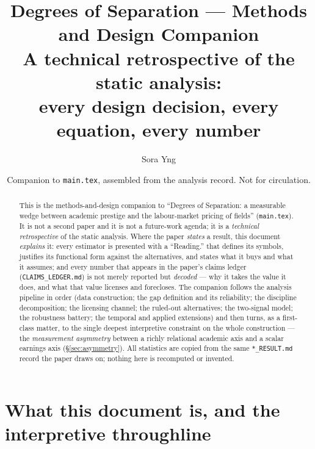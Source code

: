 \documentclass[11pt]{article}
\title{\textbf{Degrees of Separation --- Methods and Design Companion}\\[4pt]
\large A technical retrospective of the static analysis:\\
every design decision, every equation, every number}
\author{Sora Yng \and \coauthor{authorship/order to be set; see COAUTHOR\_NOTES.md}}
\date{Companion to \texttt{main.tex}, assembled from the analysis record. Not for circulation.}
\begin{document}
\maketitle

\begin{abstract}
This is the methods-and-design companion to ``Degrees of Separation: a measurable wedge between academic
prestige and the labour-market pricing of fields'' (\texttt{main.tex}). It is not a second paper and it is not
a future-work agenda; it is a \emph{technical retrospective} of the static analysis. Where the paper
\emph{states} a result, this document \emph{explains} it: every estimator is presented with a ``Reading.''
that defines its symbols, justifies its functional form against the alternatives, and states what it buys and
what it assumes; and every number that appears in the paper's claims ledger (\texttt{CLAIMS\_LEDGER.md}) is not
merely reported but \emph{decoded} --- why it takes the value it does, and what that value licenses and
forecloses. The companion follows the analysis pipeline in order (data construction; the gap definition and its
reliability; the discipline decomposition; the licensing channel; the ruled-out alternatives; the two-signal
model; the robustness battery; the temporal and applied extensions) and then turns, as a first-class matter, to
the single deepest interpretive constraint on the whole construction --- the \emph{measurement asymmetry}
between a richly relational academic axis and a scalar earnings axis (\S\ref{sec:asymmetry}). All statistics are
copied from the same \texttt{*\_RESULT.md} record the paper draws on; nothing here is recomputed or invented.
\end{abstract}

\section{What this document is, and the interpretive throughline}\label{sec:companion-intro}
\end{document}
